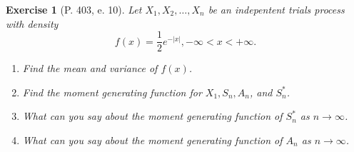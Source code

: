 \documentclass[paper=leter, fontsize=11pt]{scrartcl}
\newtheorem{ex}{Exercise}
\begin{document}
\begin{ex}[P. 403, e. 10]
  Let $X_1, X_2, \ldots, X_n$ be an indepentent trials process with density
  \begin{equation*}
    f(x) = \frac{1}{2} e^{-|x|}, -\infty < x < + \infty.
  \end{equation*}
  \begin{enumerate}
    \item Find the mean and variance of $f(x)$.
    \item Find the moment generating function for $X_1, S_n, A_n$, and $S_n^*$.
    \item What can you say about the moment generating function of $S_n^*$ as $n \rightarrow \infty$.
    \item What can you say about the moment generating function of $A_n$ as $n \rightarrow \infty$.
  \end{enumerate}
\end{ex}

% 
% 
\end{document}
